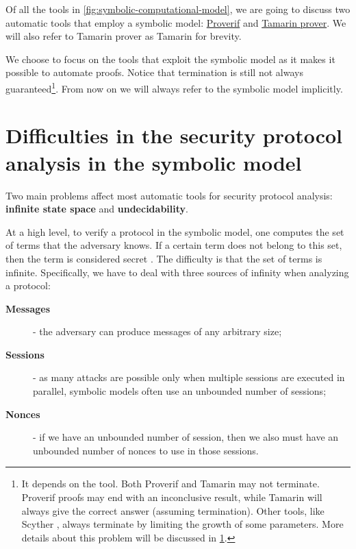 Of all the tools in \cref{fig:symbolic-computational-model}, we are going to discuss two automatic tools that employ a symbolic model: \href{https://prosecco.gforge.inria.fr/personal/bblanche/proverif/}{Proverif} and \href{https://tamarin-prover.github.io/}{Tamarin prover}. We will also refer to Tamarin prover as Tamarin for brevity.

We choose to focus on the tools that exploit the symbolic model as it makes it possible to automate proofs. Notice that termination is still not always guaranteed\footnote{It depends on the tool. Both Proverif and Tamarin may not terminate. Proverif proofs may end with an inconclusive result, while Tamarin will always give the correct answer (assuming termination). Other tools, like Scyther \cite{Scyther}, always terminate by limiting the growth of some parameters. More details about this problem will be discussed in \cref{sec:difficulties-analysis-symbolic}.}. From now on we will always refer to the symbolic model implicitly.

\section{Difficulties in the security protocol analysis in the symbolic model}
\label{sec:difficulties-analysis-symbolic}
Two main problems affect most automatic tools for security protocol analysis: \textbf{infinite state space} and \textbf{undecidability}.

At a high level, to verify a protocol in the symbolic model, one computes the set of terms that the adversary knows. If a certain term does not belong to this set, then the term is considered secret \cite{SymbolicVerificationBlanchet}. The difficulty is that the set of terms is infinite. Specifically, we have to deal with three sources of infinity when analyzing a protocol:
\begin{description}
    \item[\textbf{Messages}] - the adversary can produce messages of any arbitrary size;
    \item[\textbf{Sessions}] - as many attacks are possible only when multiple sessions are executed in parallel, symbolic models often use an unbounded number of sessions;
    \item[\textbf{Nonces}] - if we have an unbounded number of session, then we also must have an unbounded number of nonces to use in those sessions.
\end{description}

